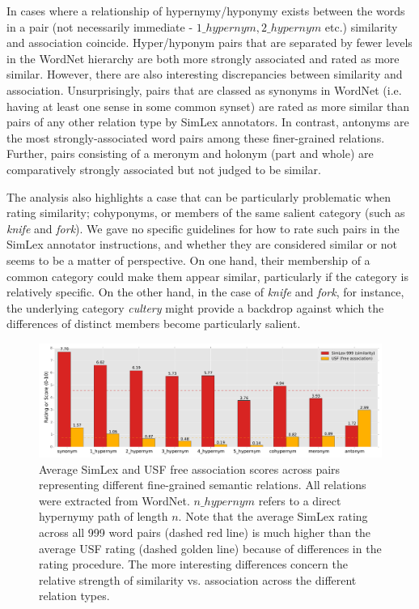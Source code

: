 \documentclass[fullname]{clv2}
\begin{document}
In cases where a relationship of hypernymy/hyponymy exists between the words in a pair (not necessarily immediate - \(1\_hypernym, 2\_hypernym\) etc.) similarity and association coincide. Hyper/hyponym pairs that are separated by fewer levels in the WordNet hierarchy are both more strongly associated and rated as more similar. However, there are also interesting discrepancies between similarity and association. Unsurprisingly, pairs that are classed as synonyms in WordNet (i.e. having at least one sense in some common synset) are rated as more similar than pairs of any other relation type by SimLex annotators. In contrast, antonyms are the most strongly-associated word pairs among these finer-grained relations. Further, pairs consisting of a meronym and holonym (part and whole) are comparatively strongly associated but not judged to be similar. 

The analysis also highlights a case that can be particularly problematic when rating similarity;  cohyponyms, or members of the same salient category (such as \emph{knife} and \emph{fork}). We gave no specific guidelines for how to rate such pairs in the SimLex annotator instructions, and whether they are considered similar or not seems to be a matter of perspective. On one hand, their membership of a common category could make them appear similar, particularly if the category is relatively specific. On the other hand, in the case of \emph{knife} and \emph{fork}, for instance, the underlying category \emph{cultery} might provide a backdrop against which the differences of distinct members become particularly salient. 

\begin{figure}[ht]  \includegraphics[width =\textwidth]{simlex_relations_CL}  \caption{Average SimLex and USF free association scores across pairs representing different fine-grained semantic relations. All relations were extracted from WordNet. \(n\_hypernym\) refers to a direct hypernymy path of length \(n\). Note that the average SimLex rating across all 999 word pairs (dashed red line) is much higher than the average USF rating (dashed golden line) because of differences in the rating procedure. The more interesting differences concern the relative strength of similarity vs. association across the different relation types.}\end{figure}  
\end{document}
